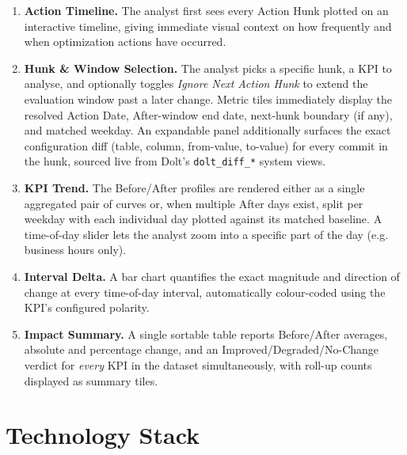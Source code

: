 \begin{enumerate}
    \item \textbf{Action Timeline.} The analyst first sees every Action
        Hunk plotted on an interactive timeline, giving immediate visual
        context on how frequently and when optimization actions have
        occurred.
    \item \textbf{Hunk \& Window Selection.} The analyst picks a specific
        hunk, a KPI to analyse, and optionally toggles \emph{Ignore Next
        Action Hunk} to extend the evaluation window past a later
        change. Metric tiles immediately display the resolved Action
        Date, After-window end date, next-hunk boundary (if any), and
        matched weekday. An expandable panel additionally surfaces the
        exact configuration diff (table, column, from-value, to-value)
        for every commit in the hunk, sourced live from Dolt's
        \texttt{dolt\_diff\_*} system views.
    \item \textbf{KPI Trend.} The Before/After profiles are rendered
        either as a single aggregated pair of curves or, when multiple
        After days exist, split per weekday with each individual day
        plotted against its matched baseline. A time-of-day slider lets
        the analyst zoom into a specific part of the day (e.g. business
        hours only).
    \item \textbf{Interval Delta.} A bar chart quantifies the exact
        magnitude and direction of change at every time-of-day interval,
        automatically colour-coded using the KPI's configured polarity.
    \item \textbf{Impact Summary.} A single sortable table reports
        Before/After averages, absolute and percentage change, and an
        Improved/Degraded/No-Change verdict for \emph{every} KPI in the
        dataset simultaneously, with roll-up counts displayed as summary
        tiles.
\end{enumerate}


\section{Technology Stack}

